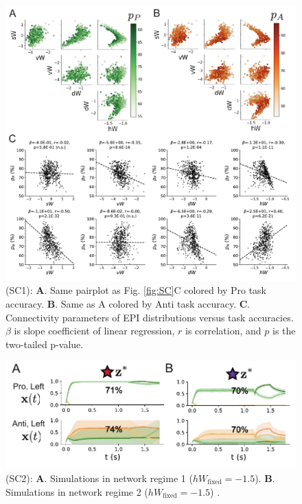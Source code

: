 \documentclass[11pt]{article}
\begin{document}
\begin{figure}
\begin{center}
\includegraphics[scale=0.9]{figures/figSC1/figSC1.pdf}
\end{center}
\caption{\small (SC1): \textbf{A}. Same pairplot as Fig. \ref{fig:SC}C colored by Pro task accuracy.  
\textbf{B}. Same as A colored by Anti task accuracy.  
\textbf{C}. Connectivity parameters of EPI distributions versus task accuracies.  $\beta$ is slope coefficient of linear regression, $r$ is correlation, and $p$ is the two-tailed p-value.
}
\label{fig:SC1}
\end{figure}

\begin{figure}
\begin{center}
\includegraphics[scale=1.]{figures/figSC2/figSC2.pdf}
\end{center}
\caption{\small (SC2):  
\textbf{A}. Simulations in network regime 1 ($hW_{\text{fixed}} = -1.5$).
\textbf{B}. Simulations in network regime 2 ($hW_{\text{fixed}} = -1.5$) .
}
\label{fig:SC2}
\end{figure}
\end{document}
